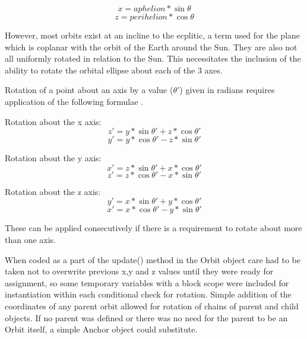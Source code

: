 \documentclass[twoside]{bhamthesis}
\begin{document}
\[x = aphelion*\sin\theta\]
\[z = perihelion*\cos\theta\]

However, most orbits exist at an incline to the ecplitic, a term used for the plane which is coplanar with the orbit of the Earth around the Sun. They are also not all uniformly rotated in relation to the Sun. This necessitates the inclusion of the ability to rotate the orbital ellipse about each of the 3 axes.

Rotation of a point about an axis by a value ($\theta'$) given in radians requires application of the following formulae \cite{acm_siggraph_education_committee_3d_2005}.

Rotation about the x axis:
\[z' = y*\sin\theta' + z*\cos\theta'\]
\[y' = y*\cos\theta' - z*\sin\theta'\]

Rotation about the y axis:
\[x' = z*\sin\theta' + x*\cos\theta'\]
\[z' = z*\cos\theta' - x*\sin\theta'\]

Rotation about the z axis:
\[y' = x*\sin\theta' + y*\cos\theta'\]
\[x' = x*\cos\theta' - y*\sin\theta'\]

These can be applied consecutively if there is a requirement to rotate about more than one axis.

When coded as a part of the update() method in the Orbit object care had to be taken not to overwrite previous x,y and z values until they were ready for assignment, so some temporary variables with a block scope were included for instantiation within each conditional check for rotation. Simple addition of the coordinates of any parent orbit allowed for rotation of chains of parent and child objects. If no parent was defined or there was no need for the parent to be an Orbit itself, a simple Anchor object could substitute.

\newpage
\end{document}
